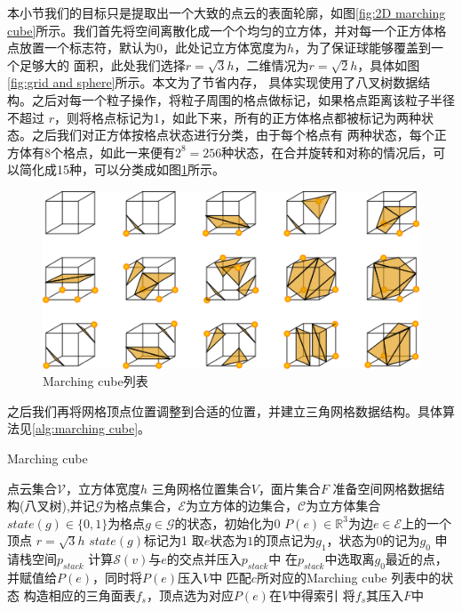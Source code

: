 本小节我们的目标只是提取出一个大致的点云的表面轮廓，如图\ref{fig:2D marching cube}所示。我们首先将空间离散化成一个个均匀的立方体，并对每一个正方体格点放置一个标志符，默认为0，此处记立方体宽度为$h$，为了保证球能够覆盖到一个足够大的
面积，此处我们选择$r = \sqrt{3}h$，二维情况为$r = \sqrt{2}h$，具体如图\ref{fig:grid and sphere}所示。本文为了节省内存，
具体实现使用了八叉树数据结构。之后对每一个粒子操作，将粒子周围的格点做标记，如果格点距离该粒子半径不超过
$r$，则将格点标记为1，如此下来，所有的正方体格点都被标记为两种状态。之后我们对正方体按格点状态进行分类，由于每个格点有
两种状态，每个正方体有8个格点，如此一来便有$2^8 = 256$种状态，在合并旋转和对称的情况后，可以简化成15种，可以分类成如图\ref{fig:marching cube table}所示。
\begin{figure}[htbp]
    \centering
    \includegraphics[scale=0.6]{./images/image6.png}
    \caption{Marching cube列表}
    \label{fig:marching cube table}
\end{figure}
之后我们再将网格顶点位置调整到合适的位置，并建立三角网格数据结构。具体算法见\ref{alg:marching cube}。
\begin{algorithm}
    \caption{Marching cube}
    \label{alg:marching cube}
    \begin{algorithmic}[1]
    \Require 点云集合$\mathcal{V}$，立方体宽度$h$
    \Ensure 三角网格位置集合$V$，面片集合$F$
    \State 准备空间网格数据结构(八叉树),并记$\mathcal{G}$为格点集合，$\mathcal{E}$为立方体的边集合，$\mathcal{C}$为立方体集合
    \State $state(g)\in \{0,1\}$为格点$g\in \mathcal{G}$的状态，初始化为0
    \State $P(e)\in \mathbb{R}^3$为边$e\in \mathcal{E}$上的一个顶点
    \State $r = \sqrt{3}h$
            \State $state(g)$标记为1    
        \EndFor
    \EndFor    
      \State  取$e$状态为$1$的顶点记为$g_1$，状态为$0$的记为$g_0$
      \State 申请栈空间$p_{stack}$
        \State 计算$\mathcal{S}(v)$与$e$的交点并压入$p_{stack}$中
      \EndFor
      \State 在$p_{stack}$中选取离$g_0$最近的点，并赋值给$P(e)$，同时将$P(e)$压入$V$中
    \EndFor
        \State 匹配$c$所对应的Marching cube 列表中的状态
        \State 构造相应的三角面表$f_s$，顶点选为对应$P(e)$在$V$中得索引
        \State 将$f_s$其压入$F$中
    \EndFor
    \end{algorithmic}
\end{algorithm}


